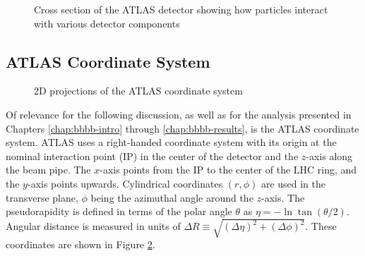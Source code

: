 \begin{figure}[ht]
\centering
{}
\caption{Cross section of the ATLAS detector showing how particles interact with various detector components \cite{ShowerImage} \label{fig:ATLAS-shower}}
\end{figure}

\subsection{ATLAS Coordinate System} 
\begin{figure}[ht]
\centering
{}
\caption{2D projections of the ATLAS coordinate system\label{fig:ATLAS-coords}}
\end{figure}

Of relevance for the following discussion, as well as for the analysis presented in Chapters \ref{chap:bbbb-intro}
through \ref{chap:bbbb-results},
is the ATLAS coordinate system. ATLAS uses a right-handed coordinate system with its origin at the nominal 
interaction point (IP) in the center of the detector and the \(z\)-axis along the beam pipe.
The \(x\)-axis points from the IP to the center of the LHC ring, and the \(y\)-axis points upwards.
Cylindrical coordinates \((r,\phi)\) are used in the transverse plane, \(\phi\) being the azimuthal angle 
around the \(z\)-axis. The pseudorapidity is defined in terms of the polar angle \(\theta\) as 
\(\eta = -\ln \tan(\theta/2)\). Angular distance is measured in units of 
\(\Delta R \equiv \sqrt{(\Delta\eta)^{2} + (\Delta\phi)^{2}}\). These coordinates are shown in Figure 
\ref{fig:ATLAS-coords}.

